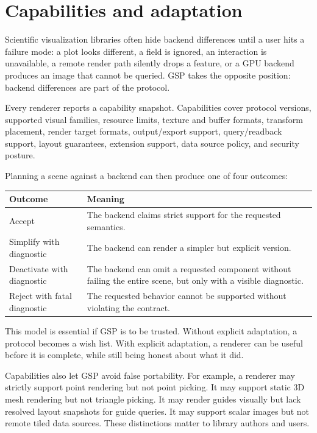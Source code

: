 \documentclass[a4paper,11pt]{article}
\newcommand{\gsp}{GSP\xspace}
\begin{document}
\section{Capabilities and adaptation}

Scientific visualization libraries often hide backend differences until a user hits a failure mode:
a plot looks different, a field is ignored, an interaction is unavailable, a remote render path
silently drops a feature, or a GPU backend produces an image that cannot be queried. \gsp takes the
opposite position: backend differences are part of the protocol.

Every renderer reports a capability snapshot. Capabilities cover protocol versions, supported
visual families, resource limits, texture and buffer formats, transform placement, render target
formats, output/export support, query/readback support, layout guarantees, extension support, data
source policy, and security posture.

Planning a scene against a backend can then produce one of four outcomes:

\begin{center}
\begin{tabularx}{0.9\textwidth}{@{}lX@{}}
\toprule
Outcome & Meaning \\
\midrule
Accept & The backend claims strict support for the requested semantics. \\
Simplify with diagnostic & The backend can render a simpler but explicit version. \\
Deactivate with diagnostic & The backend can omit a requested component without failing the
entire scene, but only with a visible diagnostic. \\
Reject with fatal diagnostic & The requested behavior cannot be supported without violating the
contract. \\
\bottomrule
\end{tabularx}
\end{center}

This model is essential if \gsp is to be trusted. Without explicit adaptation, a protocol becomes a
wish list. With explicit adaptation, a renderer can be useful before it is complete, while still
being honest about what it did.

Capabilities also let \gsp avoid false portability. For example, a renderer may strictly support
point rendering but not point picking. It may support static 3D mesh rendering but not triangle
picking. It may render guides visually but lack resolved layout snapshots for guide queries. It may
support scalar images but not remote tiled data sources. These distinctions matter to library
authors and users.
\end{document}
